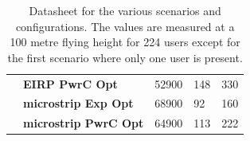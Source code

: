 \begin{table}[]
\begin{tabular}{|l|l|l|l|l|}
                                       & \textbf{EIRP \acs{PwrC Opt}}             &    52900                                &      148                    &     330                 \\ \cline{2-5} 
                                       & \textbf{microstrip \acs{Exp Opt}}        &    68900                                &      92                     &     160                 \\ \cline{2-5} 
                                       & \textbf{microstrip \acs{PwrC Opt}}       &    64900                                &      113                    &     222                 \\ \hline
\end{tabular}
\caption{Datasheet for the various scenarios and configurations. The values are measured at a 100 metre flying height for 224 users except for the first scenario where only one user is present.}
\label{table:resultOverview}
\end{table}